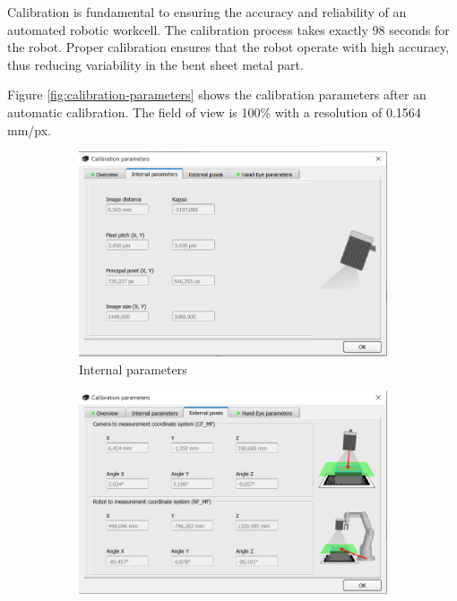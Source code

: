 Calibration is fundamental to ensuring the accuracy and reliability of an automated robotic workcell. The calibration process takes exactly 98 seconds for the robot. Proper calibration ensures that the robot operate with high accuracy, thus reducing variability in the bent sheet metal part.

Figure \ref{fig:calibration-parameters} shows the calibration parameters after an automatic calibration. The field of view is 100\% with a resolution of 0.1564 mm/px.

\begin{figure}[h]
    \centering
    \begin{subfigure}{0.48\textwidth}
        \centering
        \includegraphics[width=\textwidth]{figures/001calibration/internal_parameters.PNG}
        \caption{Internal parameters}
        \label{subfig:internal-parameters}
    \end{subfigure}\hspace{0cm}
    \begin{subfigure}{0.48\textwidth}
        \centering
        \includegraphics[width=\textwidth]{figures/001calibration/external_poses.PNG}

\end{subfigure}
\end{figure}
